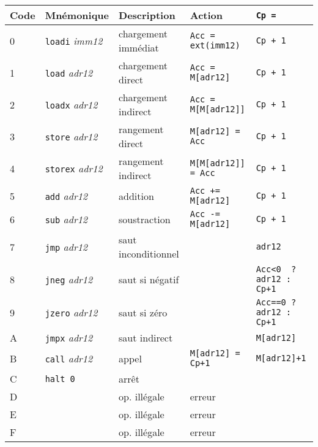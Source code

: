 \documentclass[10pt]{article}
\begin{document}
\begin{center}
\begin{tabular}{|lllll|}
\hline
Code & Mnémonique &  Description & Action & \texttt{Cp = } \\
\hline
0 & \texttt{loadi} \emph{imm12} &  chargement immédiat &  \verb/Acc = ext(imm12)/ & \verb/Cp + 1/\\
1 & \texttt{load} \emph{adr12} &  chargement direct &  \verb/Acc = M[adr12]/ & \verb/Cp + 1/ \\
2 & \texttt{loadx} \emph{adr12} &  chargement indirect &  \verb/Acc = M[M[adr12]]/& \verb/Cp + 1/ \\
3 & \texttt{store} \emph{adr12} &  rangement direct &  \verb/M[adr12] = Acc/ & \verb/Cp + 1/ \\
4 & \texttt{storex} \emph{adr12} &  rangement indirect &  \verb/M[M[adr12]] = Acc/& \verb/Cp + 1/ \\
\hline
5 & \texttt{add} \emph{adr12} & addition & \verb/Acc += M[adr12]/ & \verb/Cp + 1/ \\
6 & \texttt{sub} \emph{adr12} & soustraction & \verb/Acc -= M[adr12]/ & \verb/Cp + 1/ \\
\hline
7 & \texttt{jmp} \emph{adr12}  & saut inconditionnel & &\verb/adr12/  \\
8 & \texttt{jneg} \emph{adr12}  & saut si négatif & & \verb/Acc<0  ? adr12 : Cp+1/ \\
9 & \texttt{jzero} \emph{adr12}  & saut si zéro & & \verb/Acc==0 ? adr12 : Cp+1/ \\
\hline
A & \texttt{jmpx} \emph{adr12}  & saut indirect & & \verb/M[adr12]/ \\
B & \texttt{call} \emph{adr12}  & appel & \verb/M[adr12] = Cp+1/ & \verb/M[adr12]+1 / \\
\hline
C & \texttt{halt 0}  & arrêt & &  \\
\hline
D & & op. illégale & erreur &   \\
E & & op. illégale & erreur &   \\
F & & op. illégale & erreur &  \\
\hline
\end{tabular}
\end{center}
\end{document}
